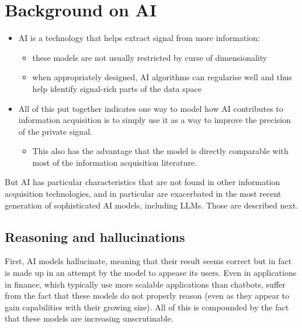 \documentclass[
]{article}
\providecommand{\tightlist}{%
  \setlength{\itemsep}{0pt}\setlength{\parskip}{0pt}}\usepackage{longtable,booktabs,array}
\theoremstyle{plain}
\theoremstyle{definition}
\theoremstyle{remark}
\begin{document}
\section{Background on AI}\label{background-on-ai}

\begin{itemize}
\tightlist
\item
  AI is a technology that helps extract signal from more information:

  \begin{itemize}
  \tightlist
  \item
    these models are not usually restricted by curse of dimensionality
  \item
    when appropriately designed, AI algorithms can regularise well and
    thus help identify signal-rich parts of the data space
  \end{itemize}
\item
  All of this put together indicates one way to model how AI contributes
  to information acquisition is to simply use it as a way to improve the
  precision of the private signal.

  \begin{itemize}
  \tightlist
  \item
    This also has the advantage that the model is directly comparable
    with most of the information acquisition literature.
  \end{itemize}
\end{itemize}

But AI has particular characteristics that are not found in other
information acquisition technologies, and in particular are exacerbated
in the most recent generation of sophisticated AI models, including
LLMs. Those are described next.

\subsection{Reasoning and
hallucinations}\label{reasoning-and-hallucinations}

First, AI models hallucinate, meaning that their result seems correct
but in fact is made up in an attempt by the model to appease its users.
Even in applications in finance, which typically use more scalable
applications than chatbots, suffer from the fact that these models do
not properly reason (even as they appear to gain capabilities with their
growing size). All of this is compounded by the fact that these models
are increasing unscrutinable.
\end{document}
